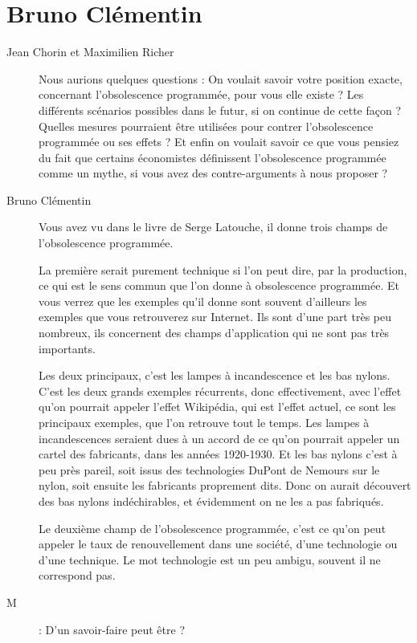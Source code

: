 \section{Bruno Clémentin}
\label{InterviewBClémentin}
\begin{description}

\item[Jean Chorin et Maximilien Richer] Nous aurions quelques questions : 
On voulait savoir votre position exacte, concernant l’obsolescence programmée, pour vous elle existe ?
Les différents scénarios possibles dans le futur, si on continue de cette façon ?
Quelles mesures pourraient être utilisées pour contrer l’obsolescence programmée ou ses effets ?
Et enfin on voulait savoir ce que vous pensiez du fait que certains économistes définissent l’obsolescence programmée comme un mythe, si vous avez des contre-arguments à nous proposer ?	

\item[Bruno Clémentin]Vous avez vu dans le livre de Serge Latouche, il donne trois champs de l'obsolescence programmée.
 
La première serait purement technique si l'on peut dire, par la production, ce qui est le sens commun que l'on donne à obsolescence programmée. Et vous verrez que les exemples qu'il donne sont souvent d'ailleurs les exemples que vous retrouverez sur Internet. Ils sont d'une part très peu nombreux, ils concernent des champs d'application qui ne sont pas très importants.
 
Les deux principaux, c'est les lampes à incandescence et les bas nylons. C'est les deux grands exemples récurrents, donc effectivement, avec l'effet qu'on pourrait appeler l'effet Wikipédia, qui est l'effet actuel, ce sont les principaux exemples, que l'on retrouve tout le temps.
Les lampes à incandescences seraient dues à un accord de ce qu'on pourrait appeler un cartel des fabricants, dans les années 1920-1930.
Et les bas nylons c'est à peu près pareil, soit issus des technologies DuPont de Nemours sur le nylon, soit ensuite les fabricants proprement dits. Donc on aurait découvert des bas nylons indéchirables, et évidemment on ne les a pas fabriqués.

Le deuxième champ de l'obsolescence programmée, c'est ce qu'on peut appeler le taux de renouvellement dans une société, d'une technologie ou d'une technique. Le mot technologie est un peu ambigu, souvent il ne correspond pas.

\item[M] : D'un savoir-faire peut être ?


\end{description}
